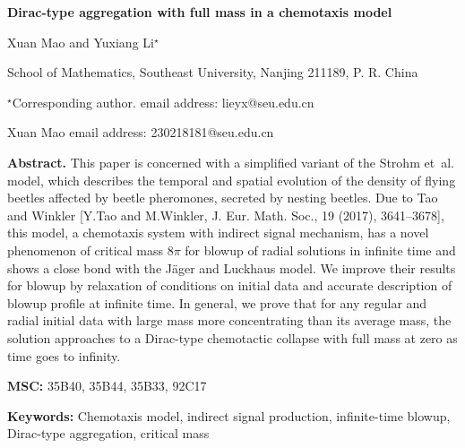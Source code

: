 \documentclass[a4paper,11pt]{article}
\begin{document}
\begin{center}
\Large{\textbf{Dirac-type aggregation with full mass in a chemotaxis model}}
\end{center}


\begin{center}
\large{  Xuan Mao and Yuxiang Li$^{\star}$}
\end{center}

\begin{center}
\normalsize{  School of Mathematics, Southeast University, Nanjing 211189, P. R. China}
\end{center}

\begin{center}
\normalsize{  $^{\star}$Corresponding author. email address: lieyx@seu.edu.cn}
\end{center}

\begin{center}
Xuan Mao email address: 230218181@seu.edu.cn
\end{center}

\noindent\textbf{Abstract.}
This paper is concerned with a simplified variant of the Strohm et~al. model,
which describes the temporal and spatial evolution of the density of flying beetles affected by beetle pheromones, secreted by nesting beetles.
Due to Tao and Winkler [Y.Tao and M.Winkler, J. Eur. Math. Soc., 19 (2017), 3641–3678], this model, a chemotaxis system with indirect signal mechanism, has a novel phenomenon of critical mass $8\pi$ for blowup of radial solutions in infinite time and shows a close bond with the J\"{a}ger and Luckhaus model.
We improve their results for blowup by relaxation of conditions on initial data and accurate description of blowup profile at infinite time.
In general, we prove that for any regular and radial initial data with large mass more concentrating than its average mass, the solution approaches to a Dirac-type chemotactic collapse with full mass at zero as time goes to infinity.

 \vskip 9mm
\noindent\textbf{MSC:} 35B40, 35B44, 35B33, 92C17

 \vskip 3mm
\noindent\textbf{Keywords:} Chemotaxis model, indirect signal production, infinite-time blowup, Dirac-type aggregation, critical mass
\end{document}
